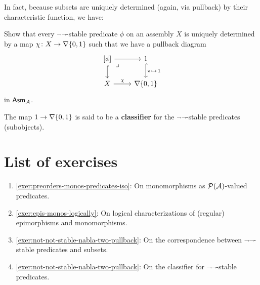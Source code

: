 In fact, because subsets are uniquely determined (again, via pullback) by their
characteristic function, we have:

\begin{exercise}\label{exer:not-not-stable-nabla-two-pullback}
  Show that every \(\lnot\lnot\)-stable predicate \(\phi\) on an assembly \(X\)
  is uniquely determined by a map \(\chi \colon X \to \nabla\{0,1\}\) such
  that we have a pullback diagram
  \[
    \begin{tikzcd}
      {[\phi]} \ar[r] \ar[d,hookrightarrow] \pbcorner
      & 1 \ar[d,hookrightarrow,"{\singleton \,\mapsto\, 1}"] \\
      X \ar[r,"\chi"] & \nabla\set{0,1}
    \end{tikzcd}
  \]
  in \(\mathsf{Asm}_{\mathcal A}\).
\end{exercise}

The map \(1 \to \nabla\{0,1\}\) is said to be a \textbf{classifier} for the
\(\lnot\lnot\)-stable predicates (subobjects).

\section{List of exercises}
\begin{enumerate}
\item \cref{exer:preorders-monos-predicates-iso}: On monomorphisms as
  \(\mathcal P(\mathcal A)\)-valued predicates.
\item \cref{exer:epis-monos-logically}: On logical characterizations of
  (regular) epimorphisms and monomorphisms.
\item \cref{exer:not-not-stable-nabla-two-pullback}: On the correspondence
  between \(\lnot\lnot\)-stable predicates and subsets.
\item \cref{exer:not-not-stable-nabla-two-pullback}: On the classifier for
  \(\lnot\lnot\)-stable predicates.
\end{enumerate}


